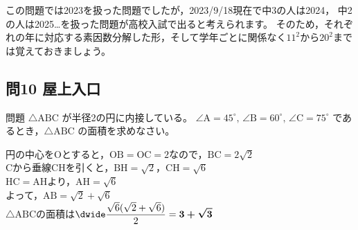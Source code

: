 \documentclass[a5paper]{ltjsarticle}
\begin{document}
この問題では2023を扱った問題でしたが，2023/9/18現在で中3の人は2024，
中2の人は2025\ldots を扱った問題が高校入試で出ると考えられます。
そのため，それぞれの年に対応する素因数分解した形，そして学年ごとに関係なく$11^2$から$20^2$までは覚えておきましょう。


\subsection*{問10 屋上入口}
\begin{itembox}[l]{問題}
  $ \triangle \mathrm{ABC} $ が半径2の円に内接している。
  $ \angle \mathrm{A} =45^{\circ},\, \angle \mathrm{B} =60^{\circ},\, \angle \mathrm{C} =75^{\circ}$ 
  であるとき，$\triangle \mathrm{ABC}$ の面積を求めなさい。
\end{itembox}

円の中心をOとすると，$\mathrm{OB}=\mathrm{OC}=2$なので，$\mathrm{BC}=2\sqrt{2}$\\
Cから垂線CHを引くと，\qquad$\mathrm{BH}=\sqrt{2}$，$\mathrm{CH}=\sqrt{6}$\\
$\mathrm{HC}=\mathrm{AH}$より，\qquad$\mathrm{AH}=\sqrt6$\\
よって，\qquad$\mathrm{AB}=\sqrt{2}+\sqrt{6}$\\
$\triangle \mathrm{ABC}$の面積は\qquad $\displaystyle\dwide \frac{\sqrt{6}(\sqrt{2}+\sqrt{6})}{2}=\bm{3+\sqrt{3}}$
\end{document}
